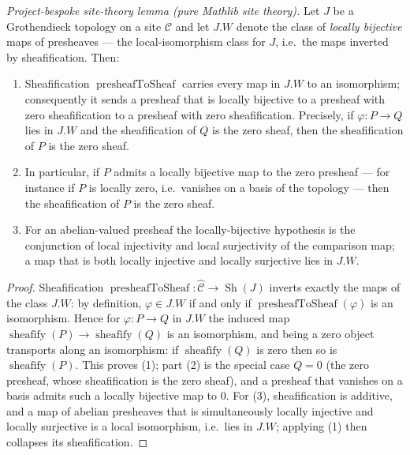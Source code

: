 \begin{lemma}
  \label{lem:sheafify_kills_locally_zero}
  \textit{Project-bespoke site-theory lemma (pure Mathlib site theory).}
  Let \(J\) be a Grothendieck topology on a site \(\mathcal{C}\) and let \(J.W\) denote the
  class of \emph{locally bijective} maps of presheaves --- the local-isomorphism class for
  \(J\), i.e.\ the maps inverted by sheafification. Then:
  \begin{enumerate}
    \item Sheafification \(\operatorname{presheafToSheaf}\) carries every map in \(J.W\) to an
      isomorphism; consequently it sends a presheaf that is locally bijective to a presheaf
      with zero sheafification to a presheaf with zero sheafification. Precisely, if
      \(\varphi : P \to Q\) lies in \(J.W\) and the sheafification of \(Q\) is the zero
      sheaf, then the sheafification of \(P\) is the zero sheaf.
    \item In particular, if \(P\) admits a locally bijective map to the zero presheaf --- for
      instance if \(P\) is locally zero, i.e.\ vanishes on a basis of the topology --- then
      the sheafification of \(P\) is the zero sheaf.
    \item For an abelian-valued presheaf the locally-bijective hypothesis is the conjunction
      of local injectivity and local surjectivity of the comparison map; a map that is both
      locally injective and locally surjective lies in \(J.W\).
  \end{enumerate}
\end{lemma}
\begin{proof}
  Sheafification \(\operatorname{presheafToSheaf} : \widehat{\mathcal{C}} \to
  \operatorname{Sh}(J)\) inverts exactly the maps of the class \(J.W\): by definition,
  \(\varphi \in J.W\) if and only if \(\operatorname{presheafToSheaf}(\varphi)\) is an
  isomorphism. Hence for \(\varphi : P \to Q\) in \(J.W\) the induced map
  \(\operatorname{sheafify}(P) \to \operatorname{sheafify}(Q)\) is an isomorphism, and
  being a zero object transports along an isomorphism: if \(\operatorname{sheafify}(Q)\)
  is zero then so is \(\operatorname{sheafify}(P)\). This proves (1); part (2) is the
  special case \(Q = 0\) (the zero presheaf, whose sheafification is the zero sheaf),
  and a presheaf that vanishes on a basis admits such a locally bijective map to \(0\).
  For (3), sheafification is additive, and a map of abelian presheaves that is
  simultaneously locally injective and locally surjective is a local isomorphism,
  i.e.\ lies in \(J.W\); applying (1) then collapses its sheafification.
\end{proof}


